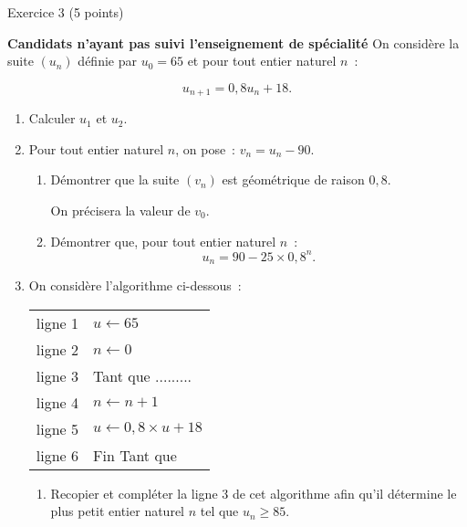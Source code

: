 
\begin{h2}Exercice 3 (5 points)\end{h2}
\textbf{Candidats n'ayant pas suivi l'enseignement de spécialité}
\medskip
On considère la suite $\left(u_n\right)$ définie par $u_0 = 65$ et pour tout entier naturel $n$~:
\par
\[u_{n+1} = 0,8u_n + 18.\]
\medskip
\begin{enumerate}
     \item Calculer $u_1$ et $u_2$.
     \item Pour tout entier naturel $n$, on pose~: $v_n = u_n - 90$.
     \begin{enumerate}[label=\alph*.]
          \item Démontrer que la suite $\left(v_n\right)$ est géométrique de raison $0,8$.
          \par
          On précisera la valeur de $v_0$.
          \item Démontrer que, pour tout entier naturel $n$~:
          \[u_n = 90 - 25 \times  0,8^n.\]
     \end{enumerate}
     \item  On considère l'algorithme ci-dessous~:
     \begin{center}
          \begin{extern}%
               \begin{tabularx}{0.5\linewidth}{|c|X|}\hline
                    ligne 1&$u \gets 65$\\
                    ligne 2&$n \gets 0$\\
                    ligne 3&Tant que .........\\
                    ligne 4&\hspace{1cm}$n \gets n+1$\\
                    ligne 5&\hspace{1cm}$u \gets 0,8 \times u + 18$\\
                    ligne 6&Fin Tant que\\ \hline
               \end{tabularx}
          \end{extern}
     \end{center}
     \medskip
     \begin{enumerate}[label=\alph*.]
          \item Recopier et compléter la ligne 3 de cet algorithme afin qu'il détermine le plus petit entier
          naturel $n$ tel que $u_n \geqslant 85$.

\end{enumerate}
\end{enumerate}
